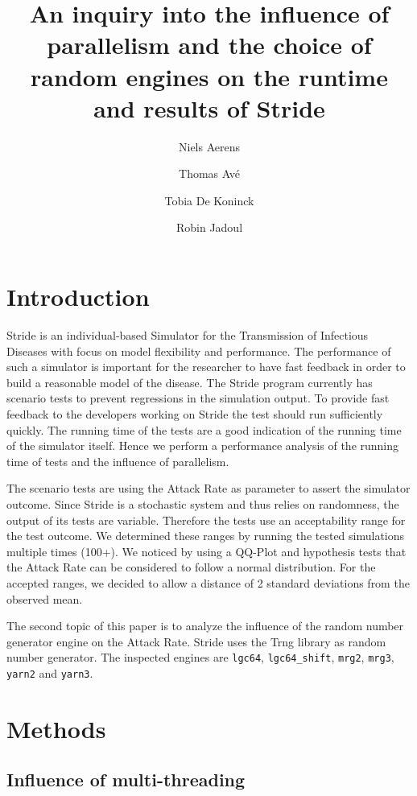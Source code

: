 \documentclass{acmart}
\title{An inquiry into the influence of parallelism and the choice of random
engines on the runtime and results of Stride}
\author{Niels Aerens}
\author{Thomas Avé}
\author{Tobia De Koninck}
\author{Robin Jadoul}
\begin{document}
\maketitle

\section{Introduction}
Stride \cite{KUYLEN20172438} is an individual-based Simulator for the Transmission of Infectious Diseases with focus on model flexibility and
performance. The performance of such a simulator is important for the researcher to have fast feedback in order to
build a reasonable model of the disease. The Stride program currently has scenario tests to prevent regressions in the
simulation output. To provide fast feedback to the developers working on Stride the test should run sufficiently quickly.
The running time of the tests are a good indication of the running time of the simulator itself. Hence we perform a
performance analysis of the running time of tests and the influence of parallelism.

The scenario tests are using the Attack Rate as parameter to assert the simulator outcome. Since Stride is a stochastic
system and thus relies on randomness, the output of its tests are variable. Therefore the tests use an acceptability range
for the test outcome. We determined these ranges by running the tested simulations multiple times (100+). We noticed
by using a QQ-Plot and hypothesis tests that the Attack Rate can be considered to follow a normal distribution.
For the accepted ranges, we decided to allow a distance of 2 standard deviations from the observed mean.

The second topic of this paper is to analyze the influence of the random number generator engine on the Attack Rate.
Stride uses the Trng library \cite{bauke2015tina} as random number generator. The inspected engines are \texttt{lgc64}, \texttt{lgc64\_shift}, \texttt{mrg2}, \texttt{mrg3}, \texttt{yarn2} and \texttt{yarn3}.

\pagebreak

\section{Methods}

\subsection{Influence of multi-threading}
\end{document}
